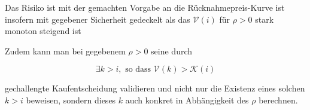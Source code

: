 \vspace{0.3cm}

Das Risiko ist mit der gemachten Vorgabe an die Rücknahmepreis-Kurve ist insofern mit gegebener Sicherheit gedeckelt als das $\mathcal{V} \left( i \right)$ für $\rho > 0$ stark monoton steigend ist

\vspace{0.3cm}

Zudem kann man bei gegebenem $\rho > 0$ seine durch

\begin{equation*}
\exists k > i, \textrm{  so dass } \mathcal{V} \left( k \right) > \mathcal{K} \left( i \right)
\end{equation*} 

gechallengte Kaufentscheidung validieren und nicht nur die Existenz eines solchen $k > i$ beweisen, sondern dieses $k$ auch konkret in Abhängigkeit des $\rho$ berechnen.

\vspace{0.5cm}

